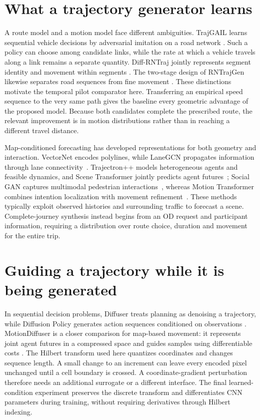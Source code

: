 \section{What a trajectory generator learns}
A route model and a motion model face different ambiguities. TrajGAIL learns sequential vehicle decisions by adversarial imitation on a road network \cite{trajgail}. Such a policy can choose among candidate links, while the rate at which a vehicle travels along a link remains a separate quantity. Diff-RNTraj jointly represents segment identity and movement within segments \cite{diffrn}. The two-stage design of RNTrajGen likewise separates road sequences from fine movement \cite{rntrajgen}. These distinctions motivate the temporal pilot comparator here. Transferring an empirical speed sequence to the very same path gives the baseline every geometric advantage of the proposed model. Because both candidates complete the prescribed route, the relevant improvement is in motion distributions rather than in reaching a different travel distance.

Map-conditioned forecasting has developed representations for both geometry and interaction. VectorNet encodes polylines, while LaneGCN propagates information through lane connectivity~\cite{vectornet,lanegcn}. Trajectron++ models heterogeneous agents and feasible dynamics, and Scene Transformer jointly predicts agent futures~\cite{tractron,scenet}; Social GAN captures multimodal pedestrian interactions~\cite{socialgan}, whereas Motion Transformer combines intention localization with movement refinement~\cite{mtr}. These methods typically exploit observed histories and surrounding traffic to forecast a scene. Complete-journey synthesis instead begins from an OD request and participant information, requiring a distribution over route choice, duration and movement for the entire trip.

\section{Guiding a trajectory while it is being generated}
In sequential decision problems, Diffuser treats planning as denoising a trajectory, while Diffusion Policy generates action sequences conditioned on observations \cite{diffuser,policy}. MotionDiffuser is a closer comparison for map-based movement: it represents joint agent futures in a compressed space and guides samples using differentiable costs \cite{motiondiff}. The Hilbert transform used here quantizes coordinates and changes sequence length. A small change to an increment can leave every encoded pixel unchanged until a cell boundary is crossed. A coordinate-gradient perturbation therefore needs an additional surrogate or a different interface. The final learned-condition experiment preserves the discrete transform and differentiates CNN parameters during training, without requiring derivatives through Hilbert indexing.

